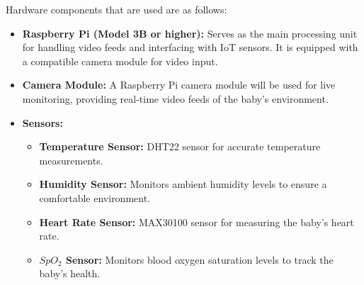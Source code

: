 \documentclass[12pt,a4paper]{report}
\begin{document}
Hardware components that are used are as follows:
\begin{itemize}
  \item \textbf{Raspberry Pi (Model 3B or higher):} Serves as the main processing unit for handling video feeds and interfacing with IoT sensors. It is equipped with a compatible camera module for video input.

  \item \textbf{Camera Module:} A Raspberry Pi camera module will be used for live monitoring, providing real-time video feeds of the baby’s environment.

  \item \textbf{Sensors:}
        \begin{itemize}
          \item \textbf{Temperature Sensor:} DHT22 sensor for accurate temperature measurements.
          \item \textbf{Humidity Sensor:} Monitors ambient humidity levels to ensure a comfortable environment.
          \item \textbf{Heart Rate Sensor:} MAX30100 sensor for measuring the baby's heart rate.
          \item \textbf{$SpO_2$ Sensor:} Monitors blood oxygen saturation levels to track the baby's health.
        \end{itemize}
\end{itemize}
\end{document}
